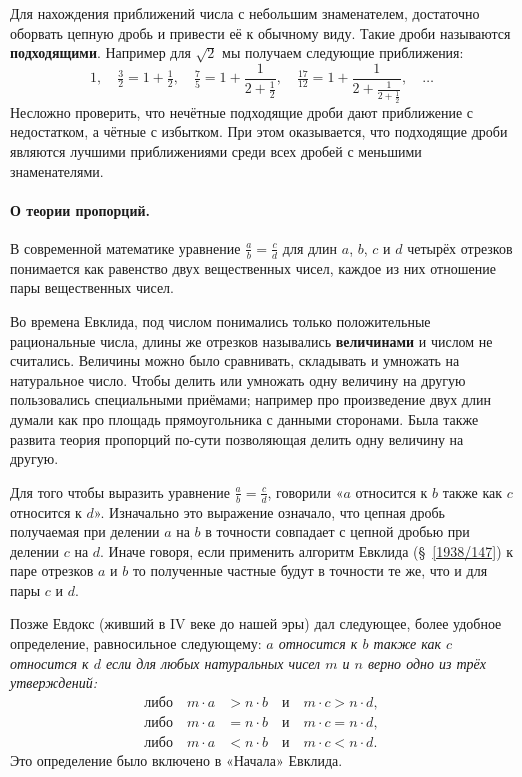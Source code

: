 \documentclass[oneside]{book}
\makeatletter
\newcommand{\rindex}[2][\imki@jobname]{%
  \index[#1]{\detokenize{#2}}%
}
\makeatother
\begin{document}
Для нахождения приближений числа с небольшим знаменателем,
достаточно оборвать цепную дробь и привести её к обычному виду.
Такие дроби называются \rindex{подходящая дробь}\textbf{подходящими}.
Например для $\sqrt2$ мы получаем следующие приближения:
\[1,\quad \tfrac 32=1+\tfrac12,\quad \tfrac75=1+\frac1{2+\frac12},\quad \tfrac{17}{12}=1+\frac1{2+\frac1{2+\frac12}},\quad \dots\]
Несложно проверить, что нечётные подходящие дроби дают приближение с недостатком, а чётные с избытком.
При этом оказывается, что подходящие дроби являются лучшими приближениями среди всех дробей с меньшими знаменателями.

\paragraph{О теории пропорций.}\label{extra/evdox}
В современной математике уравнение $\frac{a}{b}=\frac{c}{d}$
для длин $a$, $b$, $c$ и $d$ четырёх отрезков  понимается как равенство двух вещественных чисел, каждое из них отношение пары вещественных чисел.

Во времена Евклида, под числом понимались только положительные рациональные числа, длины же отрезков назывались \rindex{величина}\textbf{величинами} и числом не считались.
Величины можно было сравнивать, складывать и умножать на натуральное число. 
Чтобы делить или умножать одну величину на другую пользовались специальными приёмами;
например про произведение двух длин думали как про площадь прямоугольника с данными сторонами.
Была также развита теория пропорций по-сути позволяющая делить одну величину на другую.

Для того чтобы выразить уравнение $\frac{a}{b}=\frac{c}{d}$, говорили «$a$ относится к $b$ также как $c$ относится к $d$».
Изначально это выражение означало, что цепная дробь получаемая при делении $a$ на $b$ в точности совпадает с цепной дробью при делении $c$ на $d$.
Иначе говоря, если применить алгоритм Евклида (§~\ref{1938/147}) к паре отрезков $a$ и $b$ то полученные частные будут в точности те же, что и для пары $c$ и $d$.

Позже Евдокс (живший в IV веке до нашей эры) дал следующее, более удобное определение, равносильное следующему: \emph{$a$ относится к $b$ также как $c$ относится к $d$ если для любых натуральных чисел $m$ и $n$ верно одно из трёх утверждений:
\begin{align*}
\text{либо}\quad m\cdot a&>n\cdot b\quad\text{и}\quad m\cdot c>n\cdot d,
\\
\text{либо}\quad m\cdot a&=n\cdot b\quad\text{и}\quad m\cdot c=n\cdot d,
\\
\text{либо}\quad m\cdot a&<n\cdot b\quad\text{и}\quad m\cdot c<n\cdot d.
\end{align*}
}
Это определение было включено в «Начала» Евклида.
\end{document}

